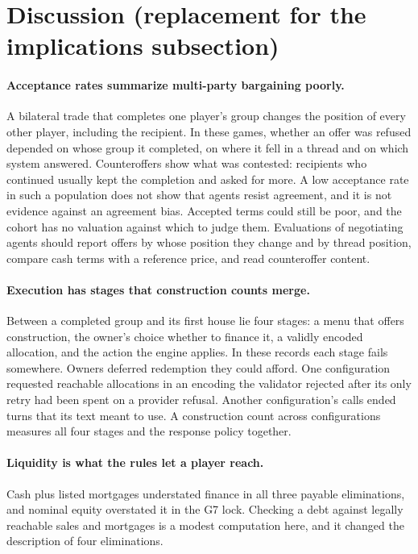 \section{Discussion (replacement for the implications subsection)}

\paragraph{Acceptance rates summarize multi-party bargaining poorly.} A bilateral trade that completes one player's group changes the position of every other player, including the recipient. In these games, whether an offer was refused depended on whose group it completed, on where it fell in a thread and on which system answered. Counteroffers show what was contested: recipients who continued usually kept the completion and asked for more. A low acceptance rate in such a population does not show that agents resist agreement, and it is not evidence against an agreement bias. Accepted terms could still be poor, and the cohort has no valuation against which to judge them. Evaluations of negotiating agents should report offers by whose position they change and by thread position, compare cash terms with a reference price, and read counteroffer content.

\paragraph{Execution has stages that construction counts merge.} Between a completed group and its first house lie four stages: a menu that offers construction, the owner's choice whether to finance it, a validly encoded allocation, and the action the engine applies. In these records each stage fails somewhere. Owners deferred redemption they could afford. One configuration requested reachable allocations in an encoding the validator rejected after its only retry had been spent on a provider refusal. Another configuration's calls ended turns that its text meant to use. A construction count across configurations measures all four stages and the response policy together.

\paragraph{Liquidity is what the rules let a player reach.} Cash plus listed mortgages understated finance in all three payable eliminations, and nominal equity overstated it in the G7 lock. Checking a debt against legally reachable sales and mortgages is a modest computation here, and it changed the description of four eliminations.


